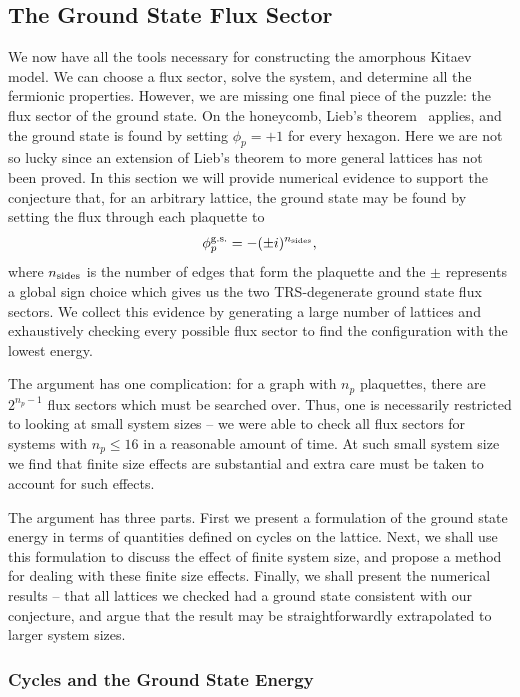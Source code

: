 \subsection{The Ground State Flux Sector} \label{sec:ground_state}

We now have all the tools necessary for constructing the amorphous Kitaev model. We can choose a flux sector, solve the system, and determine all the fermionic properties. However, we are missing one final piece of the puzzle: the flux sector of the ground state. On the honeycomb, Lieb's theorem~\cite{lieb_flux_1994} applies, and the ground state is found by setting $\phi_p = +1$ for every hexagon. Here we are not so lucky since an extension of Lieb's theorem to more general lattices has not been proved. In this section we will provide numerical evidence to support the conjecture that, for an arbitrary lattice, the ground state may be found by setting the flux through each plaquette to
\begin{align} \label{eqn:gnd_flux}
    \phi^{\textup{g.s.}}_p = -(\pm i)^{n_{\textup{sides}}},
\end{align}
where $n_{\textup{sides}}$ is the number of edges that form the plaquette and the $\pm$ represents a global sign choice which gives us the two TRS-degenerate ground state flux sectors. We collect this evidence by generating a large number of lattices and exhaustively checking every possible flux sector to find the configuration with the lowest energy.

The argument has one complication: for a graph with $n_p$ plaquettes, there are $2^{n_p - 1}$ flux sectors which must be searched over. Thus, one is necessarily restricted to looking at small system sizes -- we were able to check all flux sectors for systems with $n_p \leq 16$ in a reasonable amount of time. At such small system size we find that finite size effects are substantial and extra care must be taken to account for such effects.

The argument has three parts. First we present a formulation of the ground state energy in terms of quantities defined on cycles on the lattice. Next, we shall use this formulation to discuss the effect of finite system size, and propose a method for dealing with these finite size effects. Finally, we shall present the numerical results -- that all lattices we checked had a ground state consistent with our conjecture, and argue that the result may be straightforwardly extrapolated to larger system sizes. 

\subsubsection{Cycles and the Ground State Energy} \label{sec:cycles_and_ground_state}

